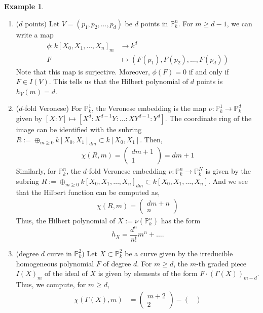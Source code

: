 \documentclass[11pt]{amsart}
\renewcommand{\P}{{\mathbb P}}
\theoremstyle{definition}
\newtheorem{example}[theorem]{Example}
\begin{document}
\begin{example}
	\label{example-hilbert-function}
	\begin{enumerate}
		\item ($d$ points) Let $V=(p_1,p_2,\ldots, p_d)$ be $d$ points in $\P_k^n$. For $m\geq d-1$, we can write a map
		\begin{align*}
		\phi: k[X_0,X_1,\ldots,X_n]_{m} &\rightarrow k^{d}\\
		F &\mapsto (F(p_1),F(p_2),\ldots,F(p_d))
		\end{align*}
		Note that this map is surjective. Moreover, $\phi(F)=0$ if and only if $F\in I(V)$. This tells us that the Hilbert polynomial of $d$ points is $h_V(m)=d$.
		\item ($d$-fold Veronese) For $\P_k^1$, the Veronese embedding is the map $\nu: \P_k^1\rightarrow \P_k^d$ given by $[X:Y]\mapsto [X^d:X^{d-1}Y:\ldots:XY^{d-1}:Y^d]$. The coordinate ring of the image can be identified with the subring $R:=\oplus_{m\geq 0} k[X_0,X_1]_{dm}\subset k[X_0,X_1]$. Then,
		\begin{align*}
		\chi(R,m)= \begin{pmatrix}
		dm+1\\
		1
		\end{pmatrix} = dm +1
		\end{align*}
		Similarly, for $\P_k^n$, the $d$-fold Veronese embedding $\nu: \P_k^n\rightarrow \P_k^N$ is given by the subring $R:=\oplus_{m\geq 0}k[X_0,X_1,\ldots,X_n]_{dm}\subset k[X_0,X_1,\ldots, X_n]$. And we see that the Hilbert function can be computed as,
		\begin{align*}
		\chi(R,m)= \begin{pmatrix}
		dm+n\\
		n
		\end{pmatrix}
		\end{align*}
		Thus, the Hilbert polynomial of $X:=\nu(\P_k^n)$ has the form \[h_X= \frac{d^n}{n!}m^n+\ldots.\]
		\item (degree $d$ curve in $\P_k^2$) Let $X\subset \P_k^2$ be a curve given by the irreducible homogeneous polynomial $F$ of degree $d$. For $m\geq d$, the $m$-th graded piece $I(X)_m$ of the ideal of $X$ is given by elements of the form $F\cdot(\Gamma(X))_{m-d}$.
		Thus, we compute, for $m\geq d$,
		\begin{align*}
		\chi(\Gamma(X),m) & = \begin{pmatrix}
		m + 2 \\
		2
		\end{pmatrix}
		- \begin{pmatrix}

\end{pmatrix}
\end{align*}
\end{enumerate}
\end{example}
\end{document}
